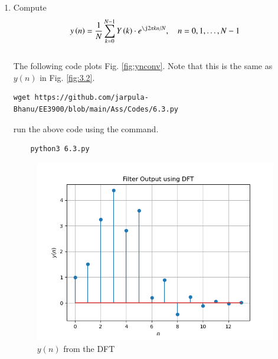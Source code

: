 \documentclass[journal,12pt,twocolumn]{IEEEtran}
\renewcommand\thesection{\arabic{section}}
\begin{document}
\begin{enumerate}[label=\thesection.\arabic*
,ref=\thesection.\theenumi]
\item Compute
\begin{equation} \label{6.3}
 y\brak{n}={\frac {1}{N}}\sum _{k=0}^{N-1}Y\brak{k}\cdot e^{\j 2\pi kn/N},\quad n = 0,1,\dots, N-1
\end{equation}
\\
\solution The following code plots Fig. \ref{fig:ynconv}. Note that this is the same as 
$y(n)$ in  Fig. 
\ref{fig:3.2}. 
%
\begin{lstlisting}
wget https://github.com/jarpula-Bhanu/EE3900/blob/main/Ass/Codes/6.3.py
\end{lstlisting}
run the above code using the command.
\begin{lstlisting}
	python3 6.3.py
\end{lstlisting}

\begin{figure}[!ht]
\centering
\includegraphics[width=\columnwidth]{./figs/6.3.png}
\caption{$y(n)$ from the DFT}
\label{fig:yndft}
\end{figure}


\end{enumerate}
\end{document}
